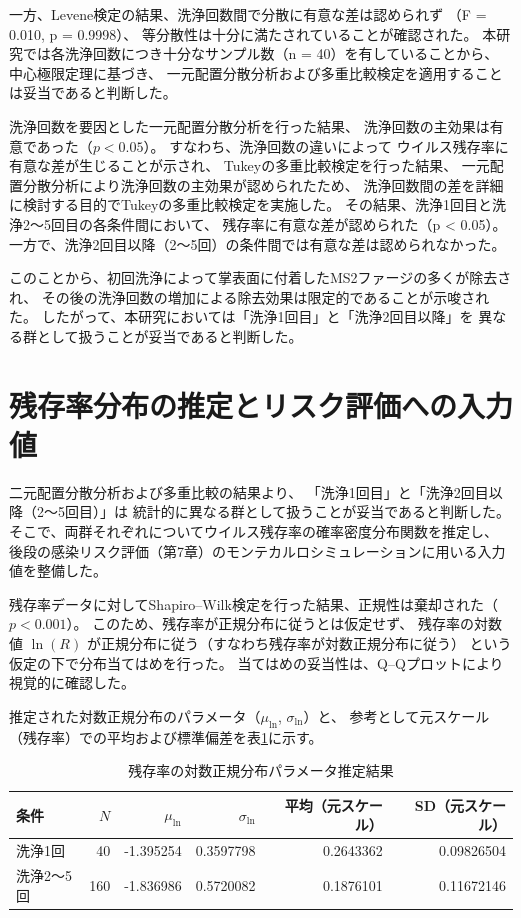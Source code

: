 一方、Levene検定の結果、洗浄回数間で分散に有意な差は認められず
（F = 0.010, p = 0.9998）、
等分散性は十分に満たされていることが確認された。
本研究では各洗浄回数につき十分なサンプル数（n = 40）を有していることから、
中心極限定理に基づき、
一元配置分散分析および多重比較検定を適用することは妥当であると判断した。

洗浄回数を要因とした一元配置分散分析を行った結果、
洗浄回数の主効果は有意であった（$p < 0.05$）。
すなわち、洗浄回数の違いによって
ウイルス残存率に有意な差が生じることが示され、
Tukeyの多重比較検定を行った結果、
一元配置分散分析により洗浄回数の主効果が認められたため、
洗浄回数間の差を詳細に検討する目的でTukeyの多重比較検定を実施した。
その結果、洗浄1回目と洗浄2～5回目の各条件間において、
残存率に有意な差が認められた（p < 0.05）。
一方で、洗浄2回目以降（2～5回）の条件間では有意な差は認められなかった。

このことから、初回洗浄によって掌表面に付着したMS2ファージの多くが除去され、
その後の洗浄回数の増加による除去効果は限定的であることが示唆された。
したがって、本研究においては「洗浄1回目」と「洗浄2回目以降」を
異なる群として扱うことが妥当であると判断した。
\section{残存率分布の推定とリスク評価への入力値}

二元配置分散分析および多重比較の結果より、
「洗浄1回目」と「洗浄2回目以降（2～5回目）」は
統計的に異なる群として扱うことが妥当であると判断した。
そこで、両群それぞれについてウイルス残存率の確率密度分布関数を推定し、
後段の感染リスク評価（第7章）のモンテカルロシミュレーションに用いる入力値を整備した。

残存率データに対してShapiro--Wilk検定を行った結果、正規性は棄却された（$p<0.001$）。
このため、残存率が正規分布に従うとは仮定せず、
残存率の対数値 $\ln(R)$ が正規分布に従う（すなわち残存率が対数正規分布に従う）
という仮定の下で分布当てはめを行った。
当てはめの妥当性は、Q--Qプロットにより視覚的に確認した。

推定された対数正規分布のパラメータ（$\mu_{\ln}$, $\sigma_{\ln}$）と、
参考として元スケール（残存率）での平均および標準偏差を表\ref{tab:lognorm_params}に示す。

\begin{table}[htbp]
  \centering
  \caption{残存率の対数正規分布パラメータ推定結果}
  \label{tab:lognorm_params}
  \small
  \begin{tabular}{l r r r r r}
    \hline
    条件 & $N$ & $\mu_{\ln}$ & $\sigma_{\ln}$ & 平均（元スケール） & SD（元スケール） \\
    \hline
    洗浄1回   & 40  & -1.395254 & 0.3597798 & 0.2643362 & 0.09826504 \\
    洗浄2～5回 & 160 & -1.836986 & 0.5720082 & 0.1876101 & 0.11672146 \\
    \hline
  \end{tabular}
\end{table}


